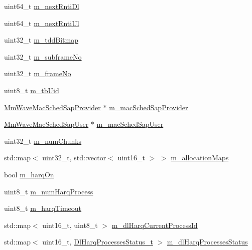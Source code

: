 \begin{DoxyCompactItemize}
uint64\+\_\+t \hyperlink{classns3_1_1MmWaveRrMacScheduler_a0de8f79fecf022efca5e65228d35cca6}{m\+\_\+next\+Rnti\+Dl}
\item 
uint64\+\_\+t \hyperlink{classns3_1_1MmWaveRrMacScheduler_ac9c27bbc2f828923b14cbc3b6ed5be57}{m\+\_\+next\+Rnti\+Ul}
\item 
uint32\+\_\+t \hyperlink{classns3_1_1MmWaveRrMacScheduler_a68cb1fd503ce4845a2d0d83c6466e58a}{m\+\_\+tdd\+Bitmap}
\item 
uint32\+\_\+t \hyperlink{classns3_1_1MmWaveRrMacScheduler_a5ec88f3d708e5ba3b2c4bfe478d458bc}{m\+\_\+subframe\+No}
\item 
uint32\+\_\+t \hyperlink{classns3_1_1MmWaveRrMacScheduler_af6f030cab6b897d4d116df8d5ed2973c}{m\+\_\+frame\+No}
\item 
uint8\+\_\+t \hyperlink{classns3_1_1MmWaveRrMacScheduler_a379f6c5cc3404d41c4082879498fc38b}{m\+\_\+tb\+Uid}
\item 
\hyperlink{classns3_1_1MmWaveMacSchedSapProvider}{Mm\+Wave\+Mac\+Sched\+Sap\+Provider} $\ast$ \hyperlink{classns3_1_1MmWaveRrMacScheduler_af7bd93ab339121af06c7594fb83654c4}{m\+\_\+mac\+Sched\+Sap\+Provider}
\item 
\hyperlink{classns3_1_1MmWaveMacSchedSapUser}{Mm\+Wave\+Mac\+Sched\+Sap\+User} $\ast$ \hyperlink{classns3_1_1MmWaveRrMacScheduler_a5f6adc4e7eabd10266ede796be0d1bca}{m\+\_\+mac\+Sched\+Sap\+User}
\item 
uint32\+\_\+t \hyperlink{classns3_1_1MmWaveRrMacScheduler_a400c28eae2329becd132ff0a462bfb3a}{m\+\_\+num\+Chunks}
\item 
std\+::map$<$ uint32\+\_\+t, std\+::vector$<$ uint16\+\_\+t $>$ $>$ \hyperlink{classns3_1_1MmWaveRrMacScheduler_aac1f8a8418e80a70a78e8fb710697588}{m\+\_\+allocation\+Maps}
\item 
bool \hyperlink{classns3_1_1MmWaveRrMacScheduler_ad8bb79b5853000b363b42a158633a942}{m\+\_\+harq\+On}
\item 
uint8\+\_\+t \hyperlink{classns3_1_1MmWaveRrMacScheduler_aa123b20bcc92d47a9590e40eeaa30806}{m\+\_\+num\+Harq\+Process}
\item 
uint8\+\_\+t \hyperlink{classns3_1_1MmWaveRrMacScheduler_a77ec3d7f7e1cf5c72faba03fea768930}{m\+\_\+harq\+Timeout}
\item 
std\+::map$<$ uint16\+\_\+t, uint8\+\_\+t $>$ \hyperlink{classns3_1_1MmWaveRrMacScheduler_a6ff50e3af4095ffc47155de7d30c8d6d}{m\+\_\+dl\+Harq\+Current\+Process\+Id}
\item 
std\+::map$<$ uint16\+\_\+t, \hyperlink{classns3_1_1MmWaveRrMacScheduler_a4edf77bbe56479bae12f56826a43b134}{Dl\+Harq\+Processes\+Status\+\_\+t} $>$ \hyperlink{classns3_1_1MmWaveRrMacScheduler_a5734289010d38bd8dfe04ed50ba99936}{m\+\_\+dl\+Harq\+Processes\+Status}

\end{DoxyCompactItemize}
